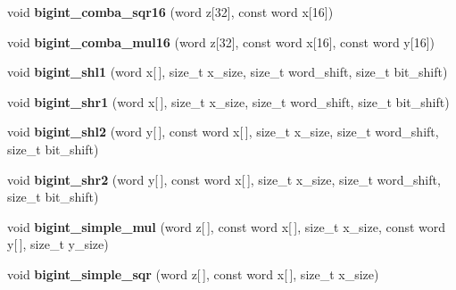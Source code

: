\begin{DoxyCompactItemize}
\item 
\hypertarget{namespaceBotan_a30ebe1c6ee7857c89289468549532a3e}{void {\bfseries bigint\-\_\-comba\-\_\-sqr16} (word z\mbox{[}32\mbox{]}, const word x\mbox{[}16\mbox{]})}\label{namespaceBotan_a30ebe1c6ee7857c89289468549532a3e}

\item 
\hypertarget{namespaceBotan_adf5900b5388f9c73ab26a964a45f734c}{void {\bfseries bigint\-\_\-comba\-\_\-mul16} (word z\mbox{[}32\mbox{]}, const word x\mbox{[}16\mbox{]}, const word y\mbox{[}16\mbox{]})}\label{namespaceBotan_adf5900b5388f9c73ab26a964a45f734c}

\item 
\hypertarget{namespaceBotan_a24872afc46265755e52a59856c98454d}{void {\bfseries bigint\-\_\-shl1} (word x\mbox{[}$\,$\mbox{]}, size\-\_\-t x\-\_\-size, size\-\_\-t word\-\_\-shift, size\-\_\-t bit\-\_\-shift)}\label{namespaceBotan_a24872afc46265755e52a59856c98454d}

\item 
\hypertarget{namespaceBotan_a11b30e71e7edbaffbf2cc2064a523c3e}{void {\bfseries bigint\-\_\-shr1} (word x\mbox{[}$\,$\mbox{]}, size\-\_\-t x\-\_\-size, size\-\_\-t word\-\_\-shift, size\-\_\-t bit\-\_\-shift)}\label{namespaceBotan_a11b30e71e7edbaffbf2cc2064a523c3e}

\item 
\hypertarget{namespaceBotan_a7dbf6925cd8001d366fd3fb5f50ddc7e}{void {\bfseries bigint\-\_\-shl2} (word y\mbox{[}$\,$\mbox{]}, const word x\mbox{[}$\,$\mbox{]}, size\-\_\-t x\-\_\-size, size\-\_\-t word\-\_\-shift, size\-\_\-t bit\-\_\-shift)}\label{namespaceBotan_a7dbf6925cd8001d366fd3fb5f50ddc7e}

\item 
\hypertarget{namespaceBotan_ac391d5980517de118fb57b798ab9e48a}{void {\bfseries bigint\-\_\-shr2} (word y\mbox{[}$\,$\mbox{]}, const word x\mbox{[}$\,$\mbox{]}, size\-\_\-t x\-\_\-size, size\-\_\-t word\-\_\-shift, size\-\_\-t bit\-\_\-shift)}\label{namespaceBotan_ac391d5980517de118fb57b798ab9e48a}

\item 
\hypertarget{namespaceBotan_a2c1ab70c20e3f6602f6ecf8ab8e864e2}{void {\bfseries bigint\-\_\-simple\-\_\-mul} (word z\mbox{[}$\,$\mbox{]}, const word x\mbox{[}$\,$\mbox{]}, size\-\_\-t x\-\_\-size, const word y\mbox{[}$\,$\mbox{]}, size\-\_\-t y\-\_\-size)}\label{namespaceBotan_a2c1ab70c20e3f6602f6ecf8ab8e864e2}

\item 
\hypertarget{namespaceBotan_a406c5e0d536dd6dda2df20202de7a592}{void {\bfseries bigint\-\_\-simple\-\_\-sqr} (word z\mbox{[}$\,$\mbox{]}, const word x\mbox{[}$\,$\mbox{]}, size\-\_\-t x\-\_\-size)}\label{namespaceBotan_a406c5e0d536dd6dda2df20202de7a592}


\end{DoxyCompactItemize}
